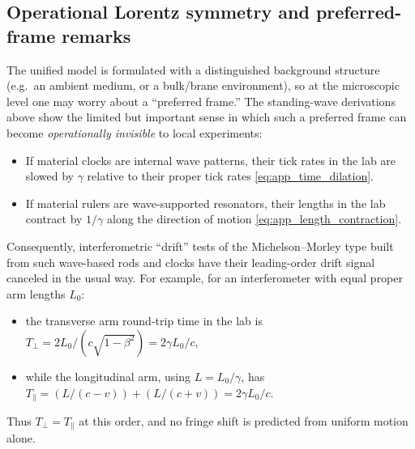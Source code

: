 \documentclass[11pt]{article}
\begin{document}
\subsection{Operational Lorentz symmetry and preferred-frame remarks}
\label{app:standing_wave_preferred_frame}

The unified model is formulated with a distinguished background structure
(e.g.\ an ambient medium, or a bulk/brane environment), so at the microscopic
level one may worry about a ``preferred frame.'' The standing-wave derivations
above show the limited but important sense in which such a preferred frame can
become \emph{operationally invisible} to local experiments:

\begin{itemize}
\item If material clocks are internal wave patterns, their tick rates in the lab
are slowed by $\gamma$ relative to their proper tick rates
\eqref{eq:app_time_dilation}.
\item If material rulers are wave-supported resonators, their lengths in the
lab contract by $1/\gamma$ along the direction of motion
\eqref{eq:app_length_contraction}.
\end{itemize}

Consequently, interferometric ``drift'' tests of the Michelson--Morley type
built from such wave-based rods and clocks have their leading-order drift
signal canceled in the usual way. For example, for an interferometer with equal
proper arm lengths $L_0$:

\begin{itemize}
\item the transverse arm round-trip time in the lab is
$T_\perp = 2L_0/(c\sqrt{1-\beta^2}) = 2\gamma L_0/c$,
\item while the longitudinal arm, using $L=L_0/\gamma$, has
$T_\parallel = (L/(c-v))+(L/(c+v)) = 2\gamma L_0/c$.
\end{itemize}

Thus $T_\perp=T_\parallel$ at this order, and no fringe shift is predicted from
uniform motion alone.
\end{document}
